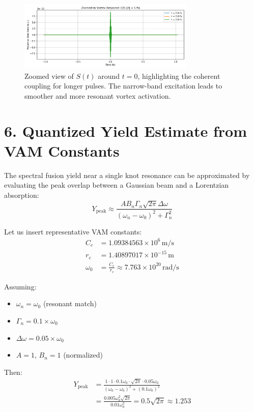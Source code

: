 \begin{figure}[h!]
  \centering
  \includegraphics[width=0.75\textwidth]{../images/Appendix_BeamSwirlInteractionSpectrumImage4}
  \caption{Zoomed view of $S(t)$ around $t = 0$, highlighting the coherent coupling for longer pulses. The narrow-band excitation leads to smoother and more resonant vortex activation.}
\end{figure}


\section*{6. Quantized Yield Estimate from VAM Constants}

The spectral fusion yield near a single knot resonance can be approximated by evaluating the peak overlap between a Gaussian beam and a Lorentzian absorption:
\begin{equation}
Y_{\text{peak}} \approx \frac{A B_n \Gamma_n \sqrt{2\pi} \Delta \omega}{(\omega_n - \omega_0)^2 + \Gamma_n^2}
\end{equation}

Let us insert representative VAM constants:
\begin{align*}
C_e &= 1.09384563 \times 10^6 \, \text{m/s} \\
r_c &= 1.40897017 \times 10^{-15} \, \text{m} \\
\omega_0 &= \frac{C_e}{r_c} \approx 7.763 \times 10^{20} \, \text{rad/s}
\end{align*}

Assuming:
\begin{itemize}
  \item $\omega_n = \omega_0$ (resonant match)
  \item $\Gamma_n = 0.1 \times \omega_0$
  \item $\Delta \omega = 0.05 \times \omega_0$
  \item $A = 1$, $B_n = 1$ (normalized)
\end{itemize}

Then:
\begin{align*}
Y_{\text{peak}} &= \frac{1 \cdot 1 \cdot 0.1 \omega_0 \cdot \sqrt{2\pi} \cdot 0.05 \omega_0}{(\omega_0 - \omega_0)^2 + (0.1 \omega_0)^2} \\
&= \frac{0.005 \omega_0^2 \sqrt{2\pi}}{0.01 \omega_0^2} = 0.5 \sqrt{2\pi} \approx 1.253
\end{align*}


